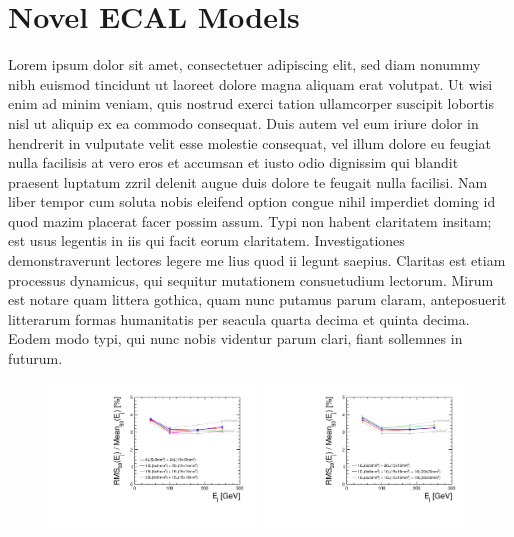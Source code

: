 \documentclass[final,3p,times,twocolumn]{elsarticle}
\begin{document}

\section{Novel ECAL Models}
Lorem ipsum dolor sit amet, consectetuer adipiscing elit, sed diam nonummy nibh euismod tincidunt ut laoreet dolore magna aliquam erat volutpat. Ut wisi enim ad minim veniam, quis
nostrud exerci tation ullamcorper suscipit lobortis nisl ut aliquip ex ea commodo consequat. Duis autem vel eum iriure dolor in hendrerit in vulputate velit esse molestie consequat,
vel illum dolore eu feugiat nulla facilisis at vero eros et accumsan et iusto odio dignissim qui blandit praesent luptatum zzril delenit augue duis dolore te feugait nulla facilisi.
Nam liber tempor cum soluta nobis eleifend option congue nihil imperdiet doming id quod mazim placerat facer possim assum. Typi non habent claritatem insitam; est usus legentis in
iis qui facit eorum claritatem. Investigationes demonstraverunt lectores legere me lius quod ii legunt saepius. Claritas est etiam processus dynamicus, qui sequitur mutationem
consuetudium lectorum. Mirum est notare quam littera gothica, quam nunc putamus parum claram, anteposuerit litterarum formas humanitatis per seacula quarta decima et quinta
decima. Eodem modo typi, qui nunc nobis videntur parum clari, fiant sollemnes in futurum.

\begin{figure}[!h]
  \begin{center}
     \includegraphics[width=0.49\textwidth]{TwoG_Context_15mm.pdf}
     \includegraphics[width=0.49\textwidth]{ThreeG_Context_15mm.pdf}
     \caption{\label{}}
  \end{center}
\end{figure}
\end{document}
